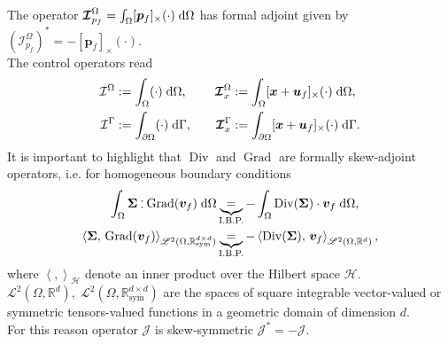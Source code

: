 \documentclass{svjour3}                     %
\DeclareMathOperator*{\Grad}{Grad}
\DeclareMathOperator*{\Div}{Div}
\newcommand{\crmat}[1]{\ensuremath{[#1]_{\times}}}
\def\onedot{$\mathsurround0pt\ldotp$}
\def\cddot{%
	\mathbin{\vcenter{\baselineskip.67ex
			\hbox{\onedot}\hbox{\onedot}}%
}}
\begin{document}
The operator $\bm{\mathcal{I}}_{p_f}^\Omega = \int_\Omega \crmat{\bm{p}_f}(\cdot) \d{\Omega}$ has formal adjoint  given by $(\bm{\mathcal{I}}_{p_f}^\Omega)^* = - \crmat{\bm{p}_f}(\cdot)$.\\

 The control operators read
\begin{equation*}
\begin{aligned}
\mathcal{I}^\Omega &:=\int_{\Omega} (\cdot) \d{\Omega}, \\
\mathcal{I}^\Gamma &:= \int_{\partial \Omega} (\cdot) \d{\Gamma}, \\
\end{aligned} \qquad
\begin{aligned} 
\bm{\mathcal{I}}_{x}^\Omega &:=\int_{\Omega} \crmat{\bm{x}+\bm{u}_f} (\cdot) \d{\Omega}, \\
\bm{\mathcal{I}}_{x}^\Gamma &:=\int_{\partial \Omega} \crmat{\bm{x}+\bm{u}_f} (\cdot) \d{\Gamma}. \\
\end{aligned}
\end{equation*}
It is important to highlight that $\Div$ and $\Grad$ are formally skew-adjoint operators, i.e. for homogeneous boundary conditions
\begin{align*}
\int_{\Omega} \bm\Sigma \cddot \Grad(\bm{v}_f) \d{\Omega} &\underbrace{=}_{\text{I.B.P.}} -\int_{\Omega} \Div(\bm\Sigma) \cdot \bm{v}_f \d{\Omega}, \\
\left\langle \bm\Sigma, \, \Grad(\bm{v}_f) \right\rangle_{\mathscr{L}^2(\Omega, \mathbb{R}^{d\times d}_{\text{sym}})} &\underbrace{=}_{\text{I.B.P.}} -\left\langle\Div(\bm\Sigma), \, \bm{v}_f \right\rangle_{\mathscr{L}^2(\Omega, \mathbb{R}^d)}, 
\end{align*}
where $\left\langle ,  \right\rangle_\mathscr{H}$ denote an inner product over the Hilbert space $\mathscr{H}$. \\
$\mathscr{L}^2(\Omega, \mathbb{R}^d), \; \mathscr{L}^2(\Omega, \mathbb{R}^{d\times d}_{\text{sym}})$ are the spaces of square integrable vector-valued or symmetric tensors-valued functions in a geometric domain of dimension $d$. \\
For this reason operator $\bm{\mathcal{J}}$ is skew-symmetric $\bm{\mathcal{J}}_{}^* = - \bm{\mathcal{J}}$.
\end{document}
